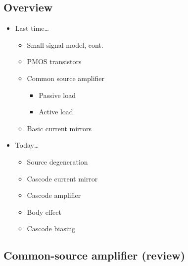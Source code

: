 \documentclass[11pt]{article}
\providecommand{\tightlist}{%
      \setlength{\itemsep}{0pt}\setlength{\parskip}{0pt}}
\begin{document}
    \hypertarget{overview}{%
\subsection{Overview}\label{overview}}

    \begin{itemize}
\tightlist
\item
  Last time\ldots{}

  \begin{itemize}
  \tightlist
  \item
    Small signal model, cont.
  \item
    PMOS transistors
  \item
    Common source amplifier

    \begin{itemize}
    \tightlist
    \item
      Passive load
    \item
      Active load
    \end{itemize}
  \item
    Basic current mirrors
  \end{itemize}
\item
  Today\ldots{}

  \begin{itemize}
  \tightlist
  \item
    Source degeneration
  \item
    Cascode current mirror
  \item
    Cascode amplifier
  \item
    Body effect
  \item
    Cascode biasing
  \end{itemize}
\end{itemize}

    \hypertarget{common-source-amplifier-review}{%
\subsection{Common-source amplifier
(review)}\label{common-source-amplifier-review}}
\end{document}
